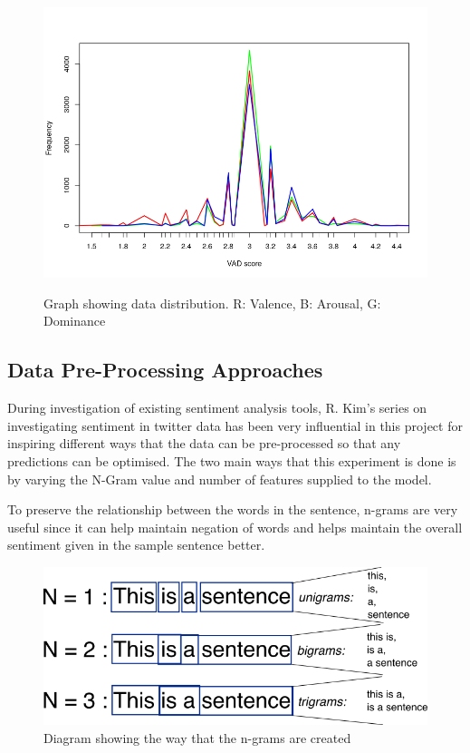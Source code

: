\begin{figure}[h]
\caption{Graph showing data distribution. R: Valence, B: Arousal, G: Dominance}
\centering
\includegraphics[scale=0.5]{graphs/VADdistribution.png}
\label{dist:vad}
\end{figure}


\subsection{Data Pre-Processing Approaches}

During investigation of existing sentiment analysis tools, R. Kim's series on investigating sentiment in twitter data \cite{towardsDS} has been very influential in this project for inspiring different ways that the data can be pre-processed so that any predictions can be optimised.
The two main ways that this experiment is done is by varying the N-Gram value and number of features supplied to the model.

To preserve the relationship between the words in the sentence, n-grams are very useful since it can help maintain negation of words and helps maintain the overall sentiment given in the sample sentence better.

\begin{figure}[h]
\caption{Diagram showing the way that the n-grams are created}
\centering
\includegraphics[scale=0.5]{litImgs/ngrams.png}
\end{figure}


